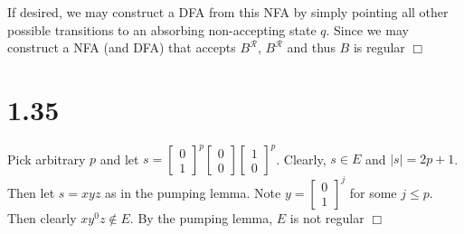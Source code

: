 \documentclass{article}
\begin{document}

\noindent
If desired, we may construct a DFA from this NFA by simply pointing all other possible transitions to an absorbing non-accepting state $q$. Since we may construct a NFA (and DFA) that accepts $B^{\mathcal{R}}$, $B^\mathcal{R}$ and thus $B$ is regular $\Box$

\section*{1.35}
Pick arbitrary $p$ and let $s = \left[\begin{smallmatrix}0\\1\end{smallmatrix}\right]^p \left[\begin{smallmatrix}0\\0\end{smallmatrix}\right] \left[\begin{smallmatrix}1\\0\end{smallmatrix}\right]^p$. Clearly, $s \in E$ and $|s| = 2p+1$. Then let $s = xyz$ as in the pumping lemma. Note $y = \left[\begin{smallmatrix}0\\1\end{smallmatrix}\right]^j$ for some $j \leq p$. Then clearly $xy^0z \notin E$. By the pumping lemma, $E$ is not regular $\Box$
\end{document}
